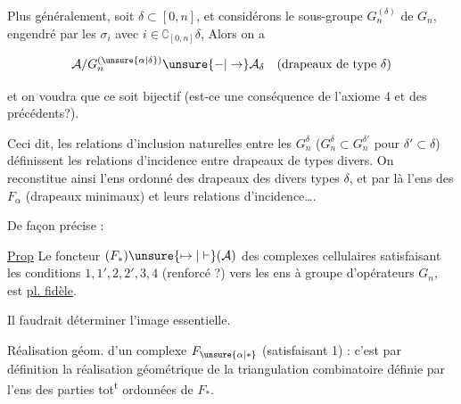 
Plus généralement, soit $\delta\subset[0,n]$, \inserted{$\delta\ne\varnothing$} et considérons le sous-groupe $G_n^{(\delta)}$ de $G_n$, engendré par les $\sigma_i$ avec $i\in\complement_{[0,n]}\delta$, Alors on a

\[
 \mathcal A/G_n^{(\unsure{\alpha|\delta})}\unsure{-|\to}\mathcal A_\delta\quad\text{(drapeaux de type }\delta\text{)}
\]

et on voudra que ce soit bijectif (est-ce une conséquence de l'axiome 4 et des précédents?).


Ceci dit, les relations d'inclusion naturelles entre les $G_n^\delta$ ($G_n^\delta\subset G_n^{\delta'}$ pour $\delta'\subset\delta$) définissent les relations d'incidence  entre drapeaux de types \deleted{\unsure{$\delta$}} divers. On reconstitue ainsi l'ens ordonné des drapeaux des divers types $\delta$, et par là l'ens des $F_\alpha$ (drapeaux minimaux) et leurs relations d'incidence\ldots.

De façon précise :

\uline{Prop} Le foncteur $(F_*)\unsure{\mapsto|\vdash}(\mathcal A)$ des complexes cellulaires satisfaisant les conditions $1,1',2,2',3,4$ (renforcé ?) vers les ens à groupe d'opérateurs $G_n$, est \uline{pl. fidèle}.

Il faudrait déterminer l'image essentielle.


Réalisation géom. d'un complexe $F_{\unsure{\alpha|*}}$ (satisfaisant  1) : c'est par définition la réalisation géométrique de la triangulation combinatoire définie par l'ens des parties  tot\textsuperscript{t} ordonnées de $F_*$.


